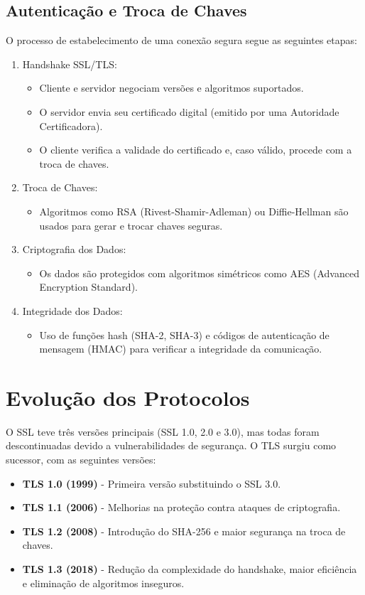 \documentclass[a4paper,12pt]{article}
\begin{document}
\subsection{Autenticação e Troca de Chaves}
O processo de estabelecimento de uma conexão segura segue as seguintes etapas:

\begin{enumerate}
    \item Handshake SSL/TLS:
    \begin{itemize}
        \item Cliente e servidor negociam versões e algoritmos suportados.
        \item O servidor envia seu certificado digital (emitido por uma Autoridade Certificadora).
        \item O cliente verifica a validade do certificado e, caso válido, procede com a troca de chaves.
    \end{itemize}
    \item Troca de Chaves:
    \begin{itemize}
    \item Algoritmos como RSA (Rivest-Shamir-Adleman) ou Diffie-Hellman são usados para gerar e trocar chaves seguras.
    \end{itemize}
    \item Criptografia dos Dados:
    \begin{itemize}
    \item Os dados são protegidos com algoritmos simétricos como AES (Advanced Encryption Standard).
    \end{itemize}
    \item Integridade dos Dados:
    \begin{itemize}
    \item Uso de funções hash (SHA-2, SHA-3) e códigos de autenticação de mensagem (HMAC) para verificar a integridade da comunicação.
    \end{itemize}
\end{enumerate}

\section{Evolução dos Protocolos}

O SSL teve três versões principais (SSL 1.0, 2.0 e 3.0), mas todas foram descontinuadas devido a vulnerabilidades de segurança. O TLS surgiu como sucessor, com as seguintes versões:

\begin{itemize}
    \item \textbf{TLS 1.0 (1999)} - Primeira versão substituindo o SSL 3.0.
    \item \textbf{TLS 1.1 (2006)} - Melhorias na proteção contra ataques de criptografia.
    \item \textbf{TLS 1.2 (2008)} - Introdução do SHA-256 e maior segurança na troca de chaves.
    \item \textbf{TLS 1.3 (2018)} - Redução da complexidade do handshake, maior eficiência e eliminação de algoritmos inseguros.
\end{itemize}
\end{document}
